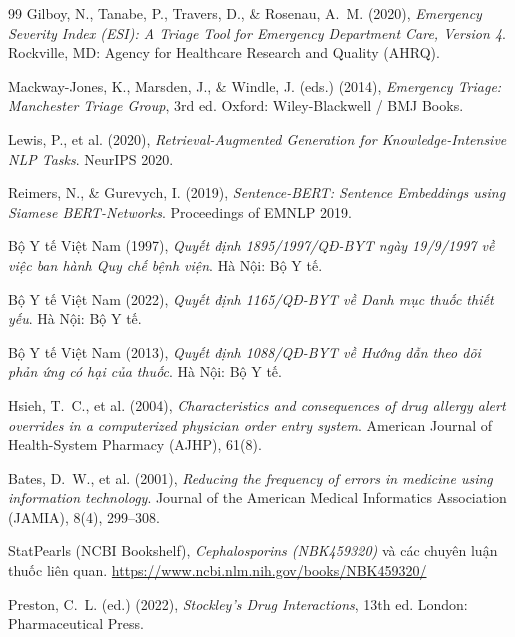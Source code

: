 \documentclass[a4paper,13pt,3p,oneside]{report}
\theoremstyle{definition}
\theoremstyle{remark}
\theoremstyle{definition}
\begin{document}
\begin{thebibliography}{99}
 Gilboy, N., Tanabe, P., Travers, D., \& Rosenau, A.~M. (2020), \textit{Emergency Severity Index (ESI): A Triage Tool for Emergency Department Care, Version 4}. Rockville, MD: Agency for Healthcare Research and Quality (AHRQ).

 Mackway-Jones, K., Marsden, J., \& Windle, J. (eds.) (2014), \textit{Emergency Triage: Manchester Triage Group}, 3rd ed. Oxford: Wiley-Blackwell / BMJ Books.

 Lewis, P., et al. (2020), \textit{Retrieval-Augmented Generation for Knowledge-Intensive NLP Tasks}. NeurIPS 2020.

 Reimers, N., \& Gurevych, I. (2019), \textit{Sentence-BERT: Sentence Embeddings using Siamese BERT-Networks}. Proceedings of EMNLP 2019.

 Bộ Y tế Việt Nam (1997), \textit{Quyết định 1895/1997/QĐ-BYT ngày 19/9/1997 về việc ban hành Quy chế bệnh viện}. Hà Nội: Bộ Y tế.


 Bộ Y tế Việt Nam (2022), \textit{Quyết định 1165/QĐ-BYT về Danh mục thuốc thiết yếu}. Hà Nội: Bộ Y tế.

 Bộ Y tế Việt Nam (2013), \textit{Quyết định 1088/QĐ-BYT về Hướng dẫn theo dõi phản ứng có hại của thuốc}. Hà Nội: Bộ Y tế.

 Hsieh, T.~C., et al. (2004), \textit{Characteristics and consequences of drug allergy alert overrides in a computerized physician order entry system}. American Journal of Health-System Pharmacy (AJHP), 61(8).

 Bates, D.~W., et al. (2001), \textit{Reducing the frequency of errors in medicine using information technology}. Journal of the American Medical Informatics Association (JAMIA), 8(4), 299--308.

 StatPearls (NCBI Bookshelf), \textit{Cephalosporins (NBK459320)} và các chuyên luận thuốc liên quan. \url{https://www.ncbi.nlm.nih.gov/books/NBK459320/}

 Preston, C.~L. (ed.) (2022), \textit{Stockley's Drug Interactions}, 13th ed. London: Pharmaceutical Press.

\end{thebibliography}
\end{document}
